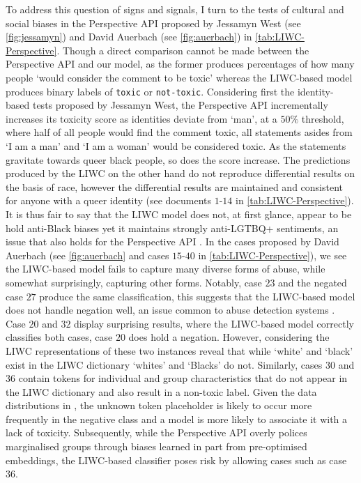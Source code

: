 To address this question of signs and signals, I turn to the tests of cultural and social biases in the Perspective API proposed by Jessamyn West (see \autoref{fig:jessamyn}) and David Auerbach (see \autoref{fig:auerbach}) in \autoref{tab:LIWC-Perspective}.  
Though a direct comparison cannot be made between the Perspective API and our model, as the former produces percentages of how many people `would consider the comment to be toxic' \citep{Perspective:Github} whereas the LIWC-based model produces binary labels of \texttt{toxic} or \texttt{not-toxic}.  
Considering first the identity-based tests proposed by Jessamyn West, the Perspective API incrementally increases its toxicity score as identities deviate from `man', at a $50\%$ threshold, where half of all people would find the comment toxic, all statements asides from `I am a man' and `I am a woman' would be considered toxic.  
As the statements gravitate towards queer black people, so does the score increase.  
The predictions produced by the LIWC on the other hand do not reproduce differential results on the basis of race, however the differential results are maintained and consistent for anyone with a queer identity (see documents $1$-$14$ in \autoref{tab:LIWC-Perspective}).  
It is thus fair to say that the LIWC model does not, at first glance, appear to be hold anti-Black biases yet it maintains strongly anti-LGTBQ+ sentiments, an issue that also holds for the Perspective API \citep{Dias:2021}.  
In the cases proposed by David Auerbach (see \autoref{fig:auerbach} and cases $15$-$40$ in \autoref{tab:LIWC-Perspective}), we see  the LIWC-based model fails to capture many diverse forms of abuse, while somewhat surprisingly, capturing other forms.  
Notably, case $23$ and the negated case $27$ produce the same classification, this suggests that the LIWC-based model does not handle negation well, an issue common to abuse detection systems \cite{Rottger:2021}.  
Case $20$ and $32$  display surprising results, where the LIWC-based model correctly classifies both cases,  case $20$ does hold a negation.  
However, considering the LIWC representations of these two instances reveal that while `white' and `black' exist in the LIWC dictionary `whites' and `Blacks' do not.  
Similarly, cases $30$ and $36$ contain tokens for individual and group characteristics that do not appear in the LIWC dictionary and also result in a non-toxic label.  
Given the data distributions in \citet{Wulczyn:2017}, the unknown token placeholder is likely to occur more frequently in the negative class and a model is more likely to associate it with a lack of toxicity.  
Subsequently, while the Perspective API overly polices marginalised groups through biases learned in part from pre-optimised embeddings, the LIWC-based classifier poses risk by allowing cases such as case $36$.  
  
